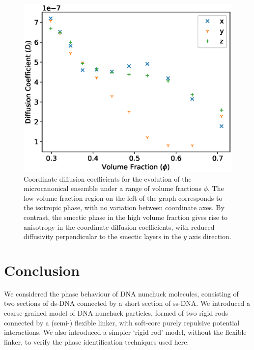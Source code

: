 \documentclass[11pt, a4paper]{article} %
\begin{document}
\begin{figure} [h!]
	\centering
	\includegraphics[width=0.7\linewidth]{Figures/nun_diff_Dcoeff}
	\caption{Coordinate diffusion coefficients for the evolution of the microcanonical ensemble under a range of volume fractions $\phi$. The low volume fraction region on the left of the graph corresponds to the isotropic phase, with no variation between coordinate axes. By contrast, the smectic phase in the high volume fraction gives rise to anisotropy in the coordinate diffusion coefficients, with reduced diffusivity perpendicular to the smectic layers in the $y$ axis direction.}
	\label{fig:nun_diff_Dcoeff}
\end{figure}  %


\section{Conclusion}

We considered the phase behaviour of DNA nunchuck molecules, consisting of two sections of ds-DNA connected by a short section of ss-DNA. We introduced a coarse-grained model of DNA nunchuck particles, formed of two rigid rods connected by a (semi-) flexible linker, with soft-core purely repulsive potential interactions. We also introduced a simpler `rigid rod' model, without the flexible linker, to verify the phase identification techniques used here.
\end{document}
